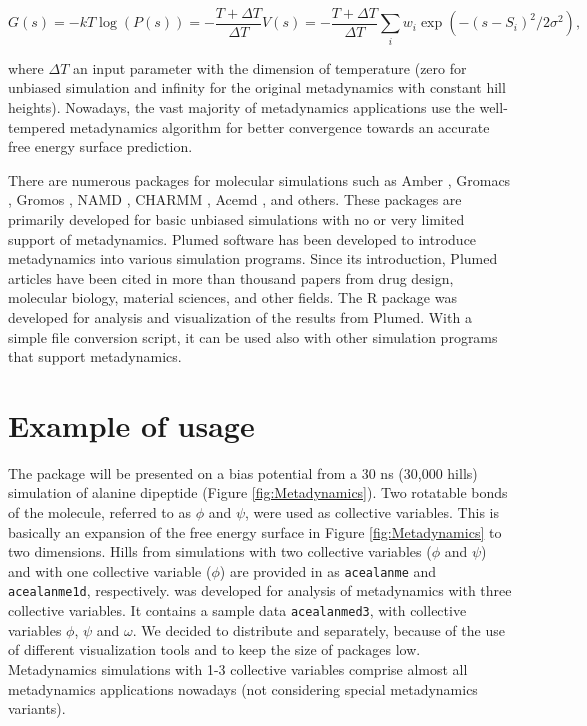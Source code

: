 \begin{equation}
G(s) = -kT \log(P(s)) = - \frac{T + \Delta T}{\Delta T} V(s) =
- \frac{T + \Delta T}{\Delta T} \sum_i w_i \exp(-(s-S_i)^2/{2 \sigma^2}),
\label{eq:wtmtd}
\end{equation}

where \(\Delta T\) an input parameter with the dimension of temperature
(zero for unbiased simulation and infinity for the original metadynamics
with constant hill heights). Nowadays, the vast majority of metadynamics
applications use the well-tempered metadynamics algorithm for better
convergence towards an accurate free energy surface prediction.

There are numerous packages for molecular simulations such as Amber
\citep{amber}, Gromacs \citep{gmx}, Gromos \citep{gms}, NAMD
\citep{namd}, CHARMM \citep{charmm}, Acemd \citep{acemd}, and others.
These packages are primarily developed for basic unbiased simulations
with no or very limited support of metadynamics. Plumed software
\citep{plumed} has been developed to introduce metadynamics into various
simulation programs. Since its introduction, Plumed articles have been
cited in more than thousand papers from drug design, molecular biology,
material sciences, and other fields. The R package
 was developed for analysis and visualization of
the results from Plumed. With a simple file conversion script, it can be
used also with other simulation programs that support metadynamics.

\hypertarget{example-of-usage}{%
\section{Example of usage}\label{example-of-usage}}

The package  will be presented on a bias potential
from a 30 ns (30,000 hills) simulation of alanine dipeptide (Figure
\ref{fig:Metadynamics}). Two rotatable bonds of the molecule, referred
to as \(\phi\) and \(\psi\), were used as collective variables. This is
basically an expansion of the free energy surface in Figure
\ref{fig:Metadynamics} to two dimensions. Hills from simulations with
two collective variables (\(\phi\) and \(\psi\)) and with one collective
variable (\(\phi\)) are provided in  as
\texttt{acealanme} and \texttt{acealanme1d}, respectively.
 was developed for analysis of metadynamics with
three collective variables. It contains a sample data
\texttt{acealanmed3}, with collective variables \(\phi\), \(\psi\) and
\(\omega\). We decided to distribute  and
 separately, because of the use of different
visualization tools and to keep the size of packages low. Metadynamics
simulations with 1-3 collective variables comprise almost all
metadynamics applications nowadays (not considering special metadynamics
variants).

